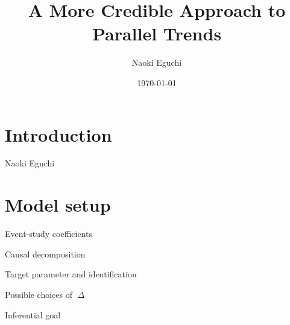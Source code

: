 \documentclass[xcolor=svgnames,aspectratio=169]{beamer}
\begin{document}
 

\title{A More Credible Approach to Parallel Trends}
\author{Naoki Eguchi}          
\date{\today}

\begin{frame}                  
  \titlepage                     
\end{frame}

\section{Introduction}

\begin{frame}{}
\begin{definition}[name]
Naoki Eguchi
\end{definition}
\end{frame}

\section{Model setup}

\begin{frame}{Event-study coefficients}
\begin{itemize}
\end{itemize}
\end{frame}

\begin{frame}{Causal decomposition}
\begin{itemize}
\end{itemize}
\end{frame}

\begin{frame}{Target parameter and identification}
\begin{itemize}
\end{itemize}
\end{frame}

\begin{frame}{Possible choices of ${\Delta}$}
\begin{itemize}
\end{itemize}
\end{frame}

\begin{frame}{Inferential goal}
\begin{itemize}
\end{itemize}
\end{frame}
\end{document}
